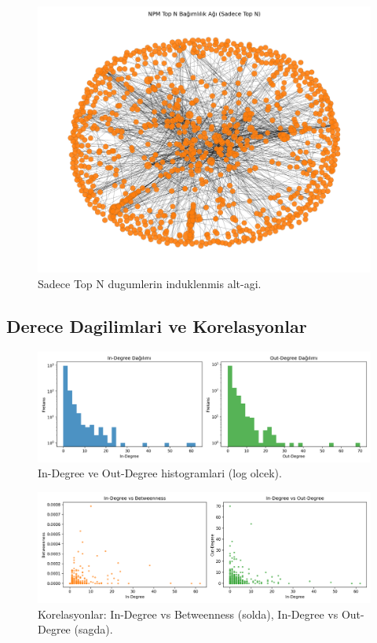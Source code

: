 \documentclass[11pt,a4paper]{article}
\begin{document}
\begin{figure}[h]
  \centering
  \includegraphics[width=0.85\linewidth]{network_topN_only.png}
  \caption{Sadece Top N dugumlerin induklenmis alt-agi.}
\end{figure}

\subsection{Derece Dagilimlari ve Korelasyonlar}
\begin{figure}[h]
  \centering
  \includegraphics[width=0.90\linewidth]{degree_histograms.png}
  \caption{In-Degree ve Out-Degree histogramlari (log olcek).}
\end{figure}

\begin{figure}[h]
  \centering
  \includegraphics[width=0.90\linewidth]{scatter_correlations.png}
  \caption{Korelasyonlar: In-Degree vs Betweenness (solda), In-Degree vs Out-Degree (sagda).}
\end{figure}
\end{document}
